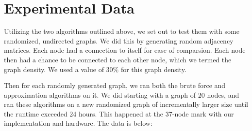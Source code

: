 \documentclass[paper.tex]{subfiles}
\begin{document}
\section{Experimental Data}

Utilizing the two algorithms outlined above, we set out to test them with some randomized, undirected graphs.
We did this by generating random adjacency matrices.
Each node had a connection to itself for ease of comparsion.
Each node then had a chance to be connected to each other node, which we termed the graph density.
We used a value of $30\%$ for this graph density.

Then for each randomly generated graph, we ran both the brute force and approximation algorithms on it.
We did starting with a graph of 20 nodes, and ran these algorithms on a new randomized graph of incrementally larger size until the runtime exceeded 24 hours.
This happened at the 37-node mark with our implementation and hardware.
The data is below:

\singlespacing
\end{document}
